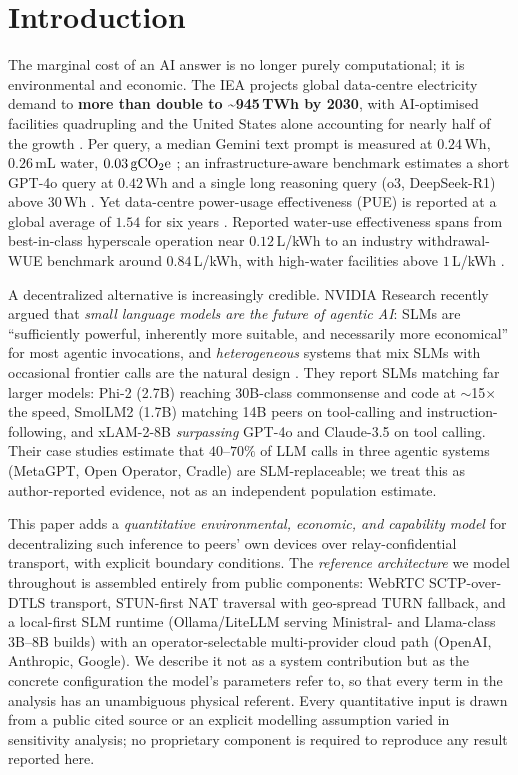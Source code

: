 \documentclass[conference]{IEEEtran}
\newcommand{\Wh}{\,\text{Wh}}
\newcommand{\mL}{\,\text{mL}}
\newcommand{\gco}{\,\text{gCO\textsubscript{2}e}}
\begin{document}
\section{Introduction}
The marginal cost of an AI answer is no longer purely computational; it is
environmental and economic. The IEA projects global data-centre electricity
demand to \textbf{more than double to \textasciitilde945\,TWh by 2030}, with
AI-optimised facilities quadrupling and the United States alone accounting for
nearly half of the growth \cite{iea2025}. Per query, a median Gemini text prompt
is measured at $0.24\Wh$, $0.26\mL$ water, $0.03\gco$ \cite{elsworth2025}; an
infrastructure-aware benchmark estimates a short GPT-4o query at $0.42\Wh$ and
a single long reasoning query (o3, DeepSeek-R1) above $30\Wh$ \cite{jegham2025}.
Yet
data-centre power-usage effectiveness (PUE) is reported at a global average of
$1.54$ for six years \cite{uptime2025}. Reported water-use effectiveness spans
from best-in-class hyperscale operation near $0.12$\,L/kWh to an industry
withdrawal-WUE benchmark around $0.84$\,L/kWh, with high-water facilities above
$1$\,L/kWh \cite{aws_water2025,devriesgao2025}.

A decentralized alternative is increasingly credible. NVIDIA Research recently
argued that \emph{small language models are the future of agentic AI}: SLMs are
``sufficiently powerful, inherently more suitable, and necessarily more
economical'' for most agentic invocations, and \emph{heterogeneous} systems that
mix SLMs with occasional frontier calls are the natural design \cite{belcak2025}.
They report SLMs matching far larger models: Phi-2 (2.7B) reaching 30B-class
commonsense and code at $\sim$15$\times$ the speed, SmolLM2 (1.7B) matching 14B
peers on tool-calling and instruction-following, and xLAM-2-8B \emph{surpassing}
GPT-4o and Claude-3.5 on tool calling. Their case studies estimate that
$40$--$70\%$ of LLM calls in three agentic systems (MetaGPT, Open Operator,
Cradle) are SLM-replaceable; we treat this as author-reported evidence, not as
an independent population estimate.

This paper adds a \emph{quantitative environmental,
economic, and capability model} for decentralizing such inference to peers'
own devices over relay-confidential transport, with explicit boundary
conditions. The \emph{reference architecture} we model throughout is assembled
entirely from public components: WebRTC SCTP-over-DTLS transport, STUN-first NAT
traversal with geo-spread TURN fallback, and a local-first SLM runtime
(Ollama/LiteLLM serving Ministral- and Llama-class 3B--8B builds) with an
operator-selectable multi-provider cloud path (OpenAI, Anthropic, Google). We
describe it not as a system contribution but as the concrete configuration the
model's parameters refer to, so that every term in the analysis has an
unambiguous physical referent. Every quantitative input is drawn from a public
cited source or an explicit modelling assumption varied in sensitivity analysis;
no proprietary component is required to reproduce any result reported here.
\end{document}
